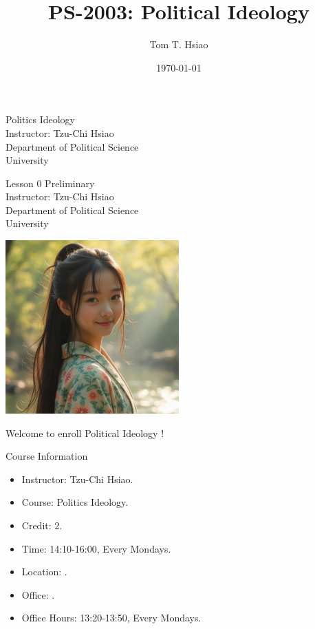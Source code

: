 \documentclass{beamer}
\title{PS-2003: Political Ideology}
\author{Tom T. Hsiao}
\date{\today}
\begin{document}
\begin{frame}
\begin{center}
\Large{Politics Ideology} \\
\vspace{3em}
\normalsize{Instructor: Tzu-Chi Hsiao} \\
\vspace{3em}
\small{Department of Political Science} \\
\vspace{1em}
\small{University}
\end{center}
\end{frame}
\begin{frame}
\begin{center}
\Large{Lesson 0 Preliminary} \\
\vspace{3em}
\normalsize{Instructor: Tzu-Chi Hsiao} \\
\vspace{3em}
\small{Department of Political Science} \\
\vspace{1em}
\small{University} \\
\end{center}
\end{frame}
\begin{frame}{}
\begin{center}
\includegraphics[width=0.5\textwidth]{instructor.png}
\end{center}
\vspace{1em}
\begin{center}
\Large{Welcome to enroll Political Ideology !}
\end{center}
\end{frame}
\begin{frame}{Course Information}
\begin{itemize}
\item Instructor: Tzu-Chi Hsiao.
\item Course: Politics Ideology.
\item Credit: 2.
\item Time: 14:10-16:00, Every Mondays.
\item Location: . 
\item Office: .
\item Office Hours: 13:20-13:50, Every Mondays.
\end{itemize}
\end{frame}
\end{document}
